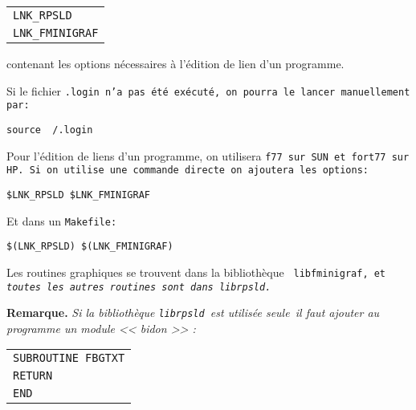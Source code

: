 \documentclass[a4paper,12pt,titlepage]{article}
\begin{document}
    \begin{center}\begin{tabular}{l}
    \verb/LNK_RPSLD/\\
    \verb/LNK_FMINIGRAF/ 
    \end{tabular}\end{center}

\noindent
contenant les options n\'ecessaires \`a l'\'edition de lien d'un programme.

    Si le fichier \tt.login \rm n'a pas \'et\'e ex\'ecut\'e, on pourra le
lancer manuellement par:

     \begin{center}
     {\tt source ~/.login}
     \end{center}

    Pour l'\'edition de liens d'un programme, on utilisera \tt f77\rm\ sur
SUN et \tt fort77\rm\ sur HP. Si on utilise une commande directe on ajoutera
les options:

      \begin{center}
      \verb/$LNK_RPSLD $LNK_FMINIGRAF/
      \end{center}

\noindent
Et dans un \tt Makefile\rm :

      \begin{center}
      \verb/$(LNK_RPSLD) $(LNK_FMINIGRAF)/
      \end{center}

   Les routines graphiques se trouvent dans la biblioth\`eque \tt
libfminigraf\rm,
et \em toutes les autres routines sont dans \em \tt librpsld\rm.

\noindent
   {\bf Remarque.} \em Si la biblioth\`eque \em {\tt librpsld}\em\ est utilis\'ee
seule\em\ il faut ajouter au programme un module << bidon  >> :

   \begin{center}\begin{tabular}{l}
      \verb/SUBROUTINE FBGTXT/\\
      \verb/RETURN/\\
      \verb/END/
   \end{tabular}\end{center}
\end{document}
